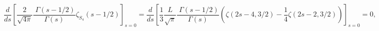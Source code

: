 \begin{equation}
\frac{d}{ds}\left[
\frac{2}{\sqrt{4\pi}}\frac{\;\Gamma(s-1/2)}{\Gamma(s)}\zeta_{S_4}(s-1/2)\right]_{s=0}
=\frac{d}{ds}\left[\frac{1}{3}\frac{L}{\sqrt{\pi}}\frac{\;\Gamma(s-1/2)}{\Gamma(s)}
\left(\zeta(2s-4,3/2)-\frac{1}{4}\zeta(2s-2,3/2)\right)\right]_{s=0}=0,
\end{equation}

